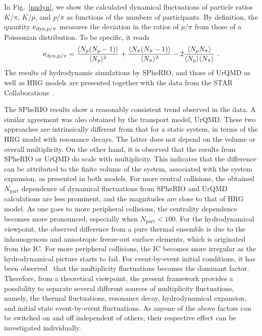 \documentclass[secnumarabic, graphics,floatfix, nofootinbib,tightenlines,nobibnotes, aps, prl, 12pt]{revtex4-1}
\begin{document}
In Fig.~\ref{nudyn}, we show the calculated dynamical fluctuations of particle ratios $K/\pi$, $K/p$, and $p/\pi$ as functions of the numbers of participants. 
By definition, the quantity $\nu_{\rm dyn,p/\pi}$ measures the deviation in the ratios of $p/\pi$ from those of a Poissonian distribution.
To be specific, it reads
\begin{eqnarray}
\nu_{\rm dyn,p/\pi} = \frac{\langle N_{p}(N_{p}-1)\rangle}{\langle N_{p}\rangle^{2}} + \frac{\langle N_{\pi}(N_{\pi}-1)\rangle}{\langle N_{\pi}\rangle^{2}} - 2\frac{\langle N_{p}N_{\pi}\rangle}{\langle N_{p}\rangle\langle N_{\pi}\rangle}\ .
\label{nudyn}
\end{eqnarray}
The results of hydrodynamic simulations by SPheRIO, and those of UrQMD as well as HRG models are presented together with the data from the STAR Collaborations~\cite{RHIC-star-mul-fluctuations-03}.

The SPheRIO results show a reasonably consistent trend observed in the data.
A similar agreement was also obtained by the transport model, UrQMD.
These two approaches are intrinsically different from that for a static system, in terms of the HRG model with resonance decays.
The latter does not depend on the volume or overall multiplicity. 
On the other hand, it is observed that the results from SPheRIO or UrQMD do scale with multiplicity.
This indicates that the difference can be attributed to the finite volume of the system, associated with the system expansion, as presented in both models.
For more central collisions, the obtained $N_{\mathrm{part}}$ dependence of dynamical fluctuations from SPheRIO and UrQMD calculations are less prominent, and the magnitudes are close to that of HRG model.
As one goes to more peripheral collisions, the centrality dependence becomes more pronounced, especially when $N_{\mathrm{part}} < 100$.
For the hydrodynamical viewpoint, the observed difference from a pure thermal ensemble is due to the inhomogenous and anisotropic freeze-out surface elements, which is originated from the IC.
For more peripheral collisions, the IC becomes more irregular as the hydrodynamical picture starts to fail.
For event-by-event initial conditions, it has been observed~\cite{sph-bes-01} that the multiplicity fluctuations becomes the dominant factor.
Therefore, from a theoretical viewpoint, the present framework provides a possibility to separate several different sources of multiplicity fluctuations, namely, the thermal fluctuations, resonance decay, hydrodynamical expansion, and initial state event-by-event fluctuations.
As anyone of the above factors can be switched on and off independent of others, their respective effect can be investigated individually.
\end{document}
